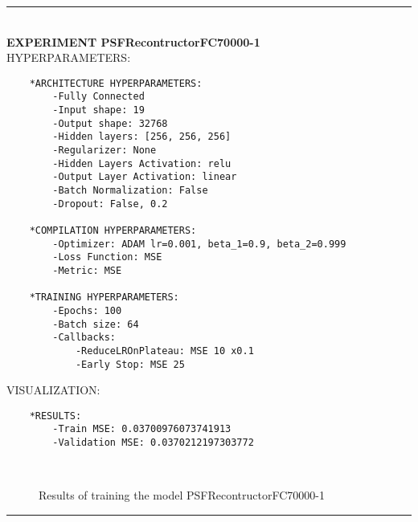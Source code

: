 \rule{0.5\textwidth}{0.5pt}\\

	{\large \textbf{EXPERIMENT PSFRecontructorFC70000-1}}\\
	
	{\normalsize HYPERPARAMETERS:}
	\begin{lstlisting}
	*ARCHITECTURE HYPERPARAMETERS:
		-Fully Connected
		-Input shape: 19
		-Output shape: 32768
		-Hidden layers: [256, 256, 256]
		-Regularizer: None
		-Hidden Layers Activation: relu
		-Output Layer Activation: linear
		-Batch Normalization: False
		-Dropout: False, 0.2
	
	*COMPILATION HYPERPARAMETERS:
		-Optimizer: ADAM lr=0.001, beta_1=0.9, beta_2=0.999
		-Loss Function: MSE
		-Metric: MSE
	
	*TRAINING HYPERPARAMETERS:
		-Epochs: 100
		-Batch size: 64
		-Callbacks: 
			-ReduceLROnPlateau: MSE 10 x0.1
			-Early Stop: MSE 25
	\end{lstlisting}
	
	{\normalsize VISUALIZATION:}
	\begin{lstlisting}
    *RESULTS:
        -Train MSE: 0.03700976073741913
        -Validation MSE: 0.0370212197303772
	\end{lstlisting}
	
	\begin{figure*}[ht!]
		\hspace{\fill}
		\hspace{\fill}	
		\\
		\caption{Results of training the model PSFRecontructorFC70000-1}
	\end{figure*}
	
\FloatBarrier	
\rule{0.5\textwidth}{0.5pt}\\